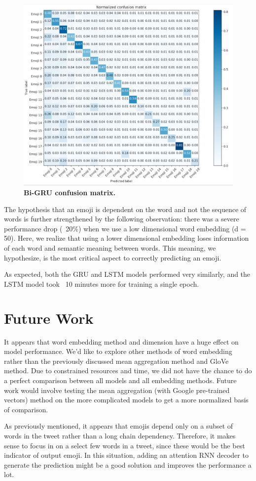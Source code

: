 \documentclass[11pt,a4paper]{article}
\begin{document}
	\begin{figure}[H]
		\hspace*{-1.3cm}
		\centering\includegraphics[scale=0.24]{bgru_confusion} 
		\caption{\textbf{Bi-GRU confusion matrix.}}
	\end{figure}

	The hypothesis that an emoji is dependent on the word and not the sequence of words is further strengthened by the following observation: there was a severe performance drop (~20\%) when we use a low dimensional word embedding (d = 50). Here, we realize that using a lower dimensional embedding loses information of each word and semantic meaning between words. This meaning, we hypothesize, is the most critical aspect to correctly predicting an emoji.
	\par
	As expected, both the GRU and LSTM models performed very similarly, and the LSTM model took ~10 minutes more for training a single epoch. 
\section{Future Work}
It appears that word embedding method and dimension have a huge effect on model performance. We’d like to explore other methods of word embedding rather than the previously discussed mean aggregation method and GloVe method. Due to constrained resources and time, we did not have the chance to do a perfect comparison between all models and all embedding methods. Future work would involve testing the mean aggregation (with Google pre-trained vectors) method on the more complicated models to get a more normalized basis of comparison.
\par
As previously mentioned, it appears that emojis depend only on a subset of words in the tweet rather than a long chain dependency. Therefore, it makes sense to focus in on a select few words in a tweet, since these would be the best indicator of output emoji. In this situation, adding an attention RNN decoder to generate the prediction might be a good solution and improves the performance a lot. 
\end{document}
